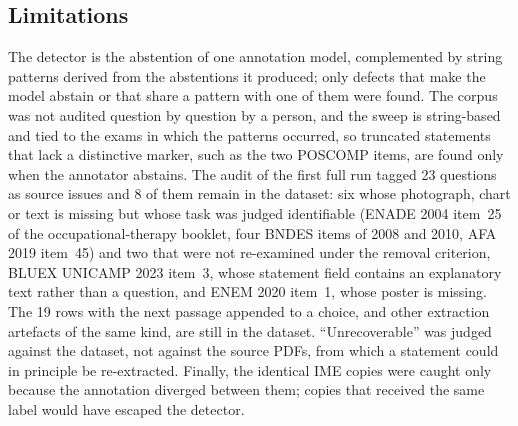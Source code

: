 \subsection{Limitations}
\label{app:rev-limitations}

The detector is the abstention of one annotation model, complemented by
string patterns derived from the abstentions it produced; only defects that
make the model abstain or that share a pattern with one of them were found.
The corpus was not audited question by question by a person, and the sweep is
string-based and tied to the exams in which the patterns occurred, so
truncated statements that lack a distinctive marker, such as the two POSCOMP
items, are found only when the annotator abstains. The audit of the first
full run tagged 23 questions as source issues and 8 of them remain in the
dataset: six whose photograph, chart or text is missing but whose task was
judged identifiable (ENADE 2004 item~25 of the occupational-therapy booklet,
four BNDES items of 2008 and 2010, AFA 2019 item~45) and two that were not
re-examined under the removal criterion, BLUEX UNICAMP 2023 item~3, whose
statement field contains an explanatory text rather than a question, and ENEM
2020 item~1, whose poster is missing. The 19 rows with the next passage
appended to a choice, and other extraction artefacts of the same kind, are
still in the dataset. ``Unrecoverable'' was judged against the dataset, not
against the source PDFs, from which a statement could in principle be
re-extracted. Finally, the identical IME copies were caught only because the
annotation diverged between them; copies that received the same label would
have escaped the detector.

